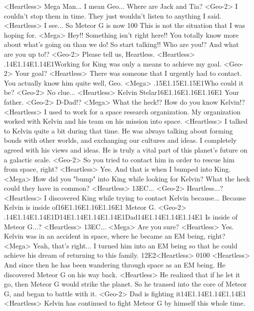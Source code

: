 <Heartless> Mega Man... I mean Geo... 
Where are Jack and Tia? 
<Geo-2> I couldn't stop them in time. 
They just wouldn't listen to anything I said. 
<Heartless> I see... 
So Meteor G is now 100%
This is not the situation that I was hoping for. 
<Mega> Hey!! Something isn't right here!! 
You totally know more about what's going on than we do! 
So start talking!! 
Who are you!? 
And what are you up to!? 
<Geo-2> Please tell us, Heartless. 
<Heartless> .{14}{E1}.{14}{E1}.{14}{E1}Working for King was only a means to achieve my goal. 
<Geo-2> Your goal? 
<Heartless> There was someone that I urgently had to contact. 
You actually know him quite well, Geo. 
<Mega> .{15}{E1}.{15}{E1}.{15}{E1}Who could it be? 
<Geo-2> No clue... 
<Heartless> Kelvin Stelar{16}{E1}.{16}{E1}.{16}{E1}.{16}{E1} 
Your father. 
<Geo-2> D-Dad!? 
<Mega> What the heck!? 
How do you know Kelvin!? 
<Heartless> I used to work for a space research organization. 
My organization worked with Kelvin and his team on his mission into space. 
<Heartless> I talked to Kelvin quite a bit during that time. 
He was always talking about forming bonds with other 
worlds, and exchanging our cultures and ideas. 
I completely agreed with his views and ideas. 
He is truly a vital part of this planet's future on a galactic scale. 
<Geo-2> So you tried to contact him in order to rescue him from space, right? 
<Heartless> Yes. 
And that is when I bumped into King. 
<Mega> How did you "bump" into King while looking for Kelvin? 
What the heck could they have in common? 
<Heartless> {13}{EC}... 
<Geo-2> Heartless...? 
<Heartless> I discovered King while trying to contact Kelvin because... 
Because Kelvin is inside of{16}{E1}.{16}{E1}.{16}{E1}.{16}{E1} 
Meteor G. 
<Geo-2> .{14}{E1}.{14}{E1}.{14}{E1}D{14}{E1}.{14}{E1}.{14}{E1}.{14}{E1}Dad{14}{E1}.{14}{E1}.{14}{E1}.{14}{E1} Is inside of Meteor G...? 
<Heartless> {13}{EC}... 
<Mega> Are you sure? 
<Heartless> Yes. 
Kelvin was in an accident in space, where he became an EM being, right? 
<Mega> Yeah, that's right... I turned him into an EM being so that he could 
achieve his dream of returning to this family. 
{12}{E2}<Heartless> {01}{00} 
<Heartless> And since then he has been wandering through space as an EM being. 
He discovered Meteor G on his way back. 
<Heartless> He realized that if he let it go, then Meteor G would strike the planet. 
So he transed into the core of Meteor G, and began to battle with it. 
<Geo-2> Dad is fighting it{14}{E1}.{14}{E1}.{14}{E1}.{14}{E1} 
<Heartless> Kelvin has continued to fight Meteor G by himself this whole time. 
